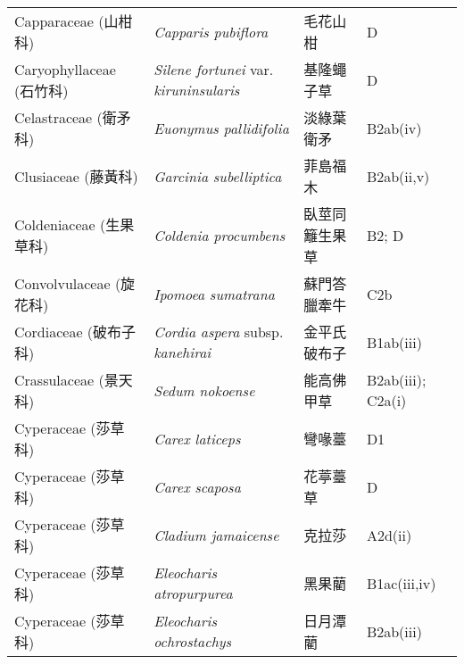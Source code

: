 \begin{longtable}{p{3cm}p{5cm}p{3cm}p{4cm}}
    Capparaceae (山柑科) & \textit{Capparis pubiflora}  & 毛花山柑 & D \index{Capparis@\textit{Capparis}!pubiflora@\textit{pubiflora}}  \index{毛花山柑} \\
    Caryophyllaceae (石竹科) & \textit{Silene fortunei} var. \textit{kiruninsularis}  & 基隆蠅子草 & D \index{Silene@\textit{Silene}!fortunei@\textit{fortunei}!var. kiruninsularis@var. \textit{kiruninsularis}}  \index{基隆蠅子草} \\
    Celastraceae (衛矛科) & \textit{Euonymus pallidifolia}  & 淡綠葉衛矛 & B2ab(iv) \index{Euonymus@\textit{Euonymus}!pallidifolia@\textit{pallidifolia}}  \index{淡綠葉衛矛} \\
    Clusiaceae (藤黃科) & \textit{Garcinia subelliptica}  & 菲島福木 & B2ab(ii,v) \index{Garcinia@\textit{Garcinia}!subelliptica@\textit{subelliptica}}  \index{菲島福木} \\
    Coldeniaceae (生果草科) & \textit{Coldenia procumbens}  & 臥莖同籬生果草 & B2; D \index{Coldenia@\textit{Coldenia}!procumbens@\textit{procumbens}}  \index{臥莖同籬生果草} \\
    Convolvulaceae (旋花科) & \textit{Ipomoea sumatrana}  & 蘇門答臘牽牛 & C2b \index{Ipomoea@\textit{Ipomoea}!sumatrana@\textit{sumatrana}}  \index{蘇門答臘牽牛} \\
    Cordiaceae (破布子科) & \textit{Cordia aspera} subsp. \textit{kanehirai}  & 金平氏破布子 & B1ab(iii) \index{Cordia@\textit{Cordia}!aspera@\textit{aspera}!subsp. kanehirai@subsp. \textit{kanehirai}}  \index{金平氏破布子} \\
    Crassulaceae (景天科) & \textit{Sedum nokoense}  & 能高佛甲草 & B2ab(iii); C2a(i) \index{Sedum@\textit{Sedum}!nokoense@\textit{nokoense}}  \index{能高佛甲草} \\
    Cyperaceae (莎草科) & \textit{Carex laticeps}  & 彎喙薹 & D1 \index{Carex@\textit{Carex}!laticeps@\textit{laticeps}}  \index{彎喙薹} \\
    Cyperaceae (莎草科) & \textit{Carex scaposa}  & 花葶薹草 & D \index{Carex@\textit{Carex}!scaposa@\textit{scaposa}}  \index{花葶薹草} \\
    Cyperaceae (莎草科) & \textit{Cladium jamaicense}  & 克拉莎 & A2d(ii) \index{Cladium@\textit{Cladium}!jamaicense@\textit{jamaicense}}  \index{克拉莎} \\
    Cyperaceae (莎草科) & \textit{Eleocharis atropurpurea}  & 黑果藺 & B1ac(iii,iv) \index{Eleocharis@\textit{Eleocharis}!atropurpurea@\textit{atropurpurea}}  \index{黑果藺} \\
    Cyperaceae (莎草科) & \textit{Eleocharis ochrostachys}  & 日月潭藺 & B2ab(iii) \index{Eleocharis@\textit{Eleocharis}!ochrostachys@\textit{ochrostachys}}  \index{日月潭藺} \\

\end{longtable}
